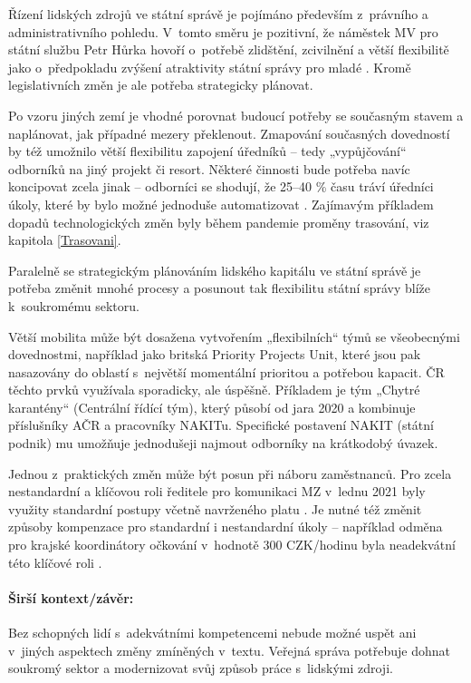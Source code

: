 Řízení lidských zdrojů ve státní správě je pojímáno především z~právního a administrativního pohledu. V~tomto směru je pozitivní, že náměstek MV pro státní službu Petr Hůrka \cite{plihalova_z_2020} hovoří o~potřebě zlidštění, zcivilnění a větší flexibilitě jako o~předpokladu zvýšení atraktivity státní správy pro mladé \cite{mpo2021}. Kromě legislativních změn je ale potřeba strategicky plánovat.

Po vzoru jiných zemí \cite{thomas_finding_2021, ministere_gestion_2015} je vhodné porovnat budoucí potřeby se současným stavem a naplánovat, jak případné mezery překlenout. Zmapování současných dovedností by též umožnilo větší flexibilitu zapojení úředníků -- tedy „vypůjčování“ odborníků na jiný projekt či resort. Některé činnosti bude potřeba navíc koncipovat zcela jinak -- odborníci se shodují, že 25--40 \% času tráví úředníci úkoly, které by bylo možné jednoduše automatizovat \cite{department_of_the_prime_minister_and_cabinet_our_2019, deloitte_augmented_2017}. Zajímavým příkladem dopadů technologických změn byly během pandemie proměny trasování, viz kapitola \ref{Trasovani}.

Paralelně se strategickým plánováním lidského kapitálu ve státní správě je potřeba změnit mnohé procesy a posunout tak flexibilitu státní správy blíže k~soukromému sektoru.

Větší mobilita může být dosažena vytvořením „flexibilních“ týmů se všeobecnými dovednostmi, například jako britská Priority Projects Unit, které jsou pak nasazovány do oblastí s~největší momentální prioritou a potřebou kapacit. ČR těchto prvků využívala sporadicky, ale úspěšně. Příkladem je tým „Chytré karantény“ (Centrální řídící tým), který působí od jara 2020 a kombinuje příslušníky AČR a pracovníky NAKITu. Specifické postavení NAKIT (státní podnik) mu umožňuje jednodušeji najmout odborníky na krátkodobý úvazek.

Jednou z~praktických změn může být posun při náboru zaměstnanců. Pro zcela nestandardní a klíčovou roli ředitele pro komunikaci MZ v~lednu 2021 byly využity standardní postupy včetně navrženého platu \cite{irozhlas_ministerstvo_2021}. Je nutné též změnit způsoby kompenzace pro standardní i nestandardní úkoly -- například odměna pro krajské koordinátory očkování v~hodnotě 300 CZK/hodinu byla neadekvátní této klíčové roli \cite{michal_blaha_pandemie_2021}.

\paragraph{Širší kontext/závěr:} Bez schopných lidí s~adekvátními kompetencemi nebude možné uspět ani v~jiných aspektech změny zmíněných v~textu. Veřejná správa potřebuje dohnat soukromý sektor a modernizovat svůj způsob práce s~lidskými zdroji.

